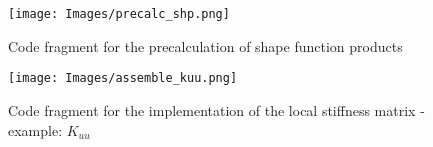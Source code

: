\documentclass[12pt]{article}
\begin{document}
\begin{figure}[H]
	
	\centering
	\texttt{[image: Images/precalc\_shp.png]}
	\caption{Code fragment for the precalculation of shape function products}
	\label{fig:precalc_shp}
\end{figure}

\begin{figure}[H]

	\centering
	\texttt{[image: Images/assemble\_kuu.png]}
	\caption{Code fragment for the implementation of the local stiffness matrix - example: $K_{uu}$}
		\label{fig:assemble_kuu}
\end{figure}


\newpage


\end{document}
